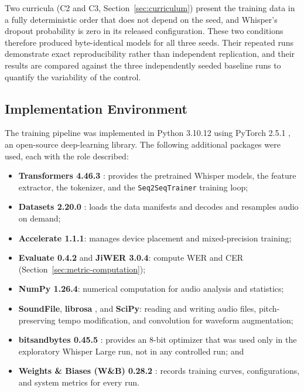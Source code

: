 Two curricula (C2 and C3, Section~\ref{sec:curriculum}) present the training data
in a fully deterministic order that does not depend on the seed, and Whisper's
dropout probability is zero in its released configuration. These two conditions
therefore produced byte-identical models for all three seeds. Their repeated runs
demonstrate exact reproducibility rather than independent replication, and their
results are compared against the three independently seeded baseline runs to
quantify the variability of the control.

\subsection{Implementation Environment}
\label{sec:implementation}

The training pipeline was implemented in Python 3.10.12 using PyTorch 2.5.1
\citep{Paszke2019}, an open-source deep-learning library. The following
additional packages were used, each with the role described:

\begin{itemize}
    \item \textbf{Transformers 4.46.3} \citep{Wolf2020}: provides the pretrained
    Whisper models, the feature extractor, the tokenizer, and the
    \texttt{Seq2SeqTrainer} training loop;
    \item \textbf{Datasets 2.20.0} \citep{Lhoest2021}: loads the data manifests and
    decodes and resamples audio on demand;
    \item \textbf{Accelerate 1.1.1}: manages device placement and mixed-precision
    training;
    \item \textbf{Evaluate 0.4.2} and \textbf{JiWER 3.0.4}: compute WER and CER
    (Section~\ref{sec:metric-computation});
    \item \textbf{NumPy 1.26.4}: numerical computation for audio analysis and
    statistics;
    \item \textbf{SoundFile}, \textbf{librosa} \citep{McFee2015}, and
    \textbf{SciPy}: reading and writing audio files, pitch-preserving tempo
    modification, and convolution for waveform augmentation;
    \item \textbf{bitsandbytes 0.45.5} \citep{Dettmers2022}: provides an 8-bit
    optimizer that was used only in the exploratory Whisper Large run, not in
    any controlled run; and
    \item \textbf{Weights \& Biases (W\&B) 0.28.2} \citep{Biewald2020}: records
    training curves, configurations, and system metrics for every run.
\end{itemize}

